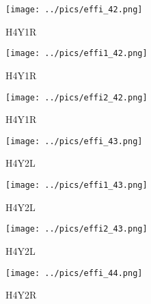 \documentclass[10pt, xcolor={dvipsnames}, aspectratio = 169]{beamer}
\begin{document}
\begin{frame}

\begin{figure}
\centering
\texttt{[image: ../pics/effi\_42.png]}
\caption{H4Y1R}
\end{figure}

\end{frame}

\begin{frame}

\begin{figure}
\centering
\texttt{[image: ../pics/effi1\_42.png]}
\caption{H4Y1R}
\end{figure}

\end{frame}

\begin{frame}

\begin{figure}
\centering
\texttt{[image: ../pics/effi2\_42.png]}
\caption{H4Y1R}
\end{figure}

\end{frame}

\begin{frame}

\begin{figure}
\centering
\texttt{[image: ../pics/effi\_43.png]}
\caption{H4Y2L}
\end{figure}

\end{frame}

\begin{frame}

\begin{figure}
\centering
\texttt{[image: ../pics/effi1\_43.png]}
\caption{H4Y2L}
\end{figure}

\end{frame}

\begin{frame}

\begin{figure}
\centering
\texttt{[image: ../pics/effi2\_43.png]}
\caption{H4Y2L}
\end{figure}

\end{frame}

\begin{frame}

\begin{figure}
\centering
\texttt{[image: ../pics/effi\_44.png]}
\caption{H4Y2R}
\end{figure}

\end{frame}
\end{document}
